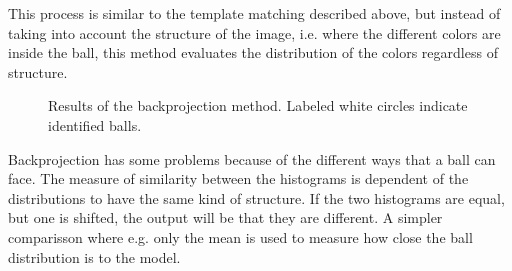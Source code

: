 This process is similar to the template matching described above, but instead of taking into account the structure of the image, i.e. where the different colors are inside the ball, this method evaluates the distribution of the colors regardless of structure.
\begin{figure}[H]
  \centering
  \quad           
   \caption{Results of the backprojection method. Labeled white circles indicate identified balls.}
  \label{fig:backprojectResults}
\end{figure}
Backprojection has some problems because of the different ways that a ball can face. The measure of similarity between the histograms is dependent of the distributions to have the same kind of structure. If the two histograms are equal, but one is shifted, the output will be that they are different. A simpler comparisson where e.g. only the mean is used to measure how close the ball distribution is to the model.

